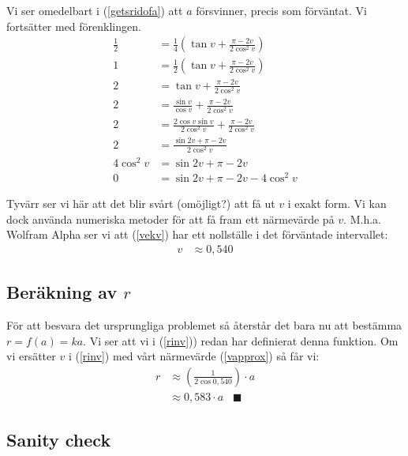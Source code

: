 \documentclass[10pt]{article}
\begin{document}
  Vi ser omedelbart i (\ref{getsridofa}) att $a$ försvinner, precis som förväntat. Vi fortsätter med förenklingen.
  \begin{align}
    \frac{1}{2} &= \frac{1}{4} \left( \tan v + \frac{\pi-2v}{2 \cos^2 v} \right) \nonumber \\
    1 &= \frac{1}{2} \left( \tan v + \frac{\pi-2v}{2 \cos^2 v} \right) \nonumber \\
    2 &= \tan v + \frac{\pi-2v}{2 \cos^2 v} \nonumber \\
    2 &= \frac{\sin v}{\cos v} + \frac{\pi-2v}{2 \cos^2 v} \nonumber \\
    2 &= \frac{2\cos v\sin v}{2\cos^2 v} + \frac{\pi-2v}{2 \cos^2 v} \nonumber \\
    2 &= \frac{\sin 2v + \pi - 2v}{2\cos^2 v} \nonumber \\
    4 \cos^2 v &= \sin 2v + \pi - 2v \nonumber \\
    0 &= \sin 2v + \pi - 2v - 4 \cos^2 v \label{vekv}
  \end{align}

  Tyvärr ser vi här att det blir svårt (omöjligt?) att få ut $v$ i exakt form. Vi kan dock använda numeriska metoder för att få fram ett närmevärde på $v$. M.h.a. Wolfram Alpha ser vi att (\ref{vekv}) har ett nollställe i det förväntade intervallet:
  \begin{align}
    v &\approx 0,540 \label{vapprox}
  \end{align}

  \subsection*{Beräkning av $r$}

  För att besvara det ursprungliga problemet så återstår det bara nu att bestämma $r = f(a) = ka$. Vi ser att vi i (\ref{rinv})) redan har definierat denna funktion. Om vi ersätter $v$ i (\ref{rinv}) med vårt närmevärde (\ref{vapprox}) så får vi:
  \begin{align}
    r &\approx \left(\frac{1}{2 \cos 0,540}\right) \cdot a \nonumber \\
    &\approx 0,583 \cdot a \hspace{10pt} \blacksquare \label{ranswer}
  \end{align}

  \subsection*{Sanity check}
\end{document}

